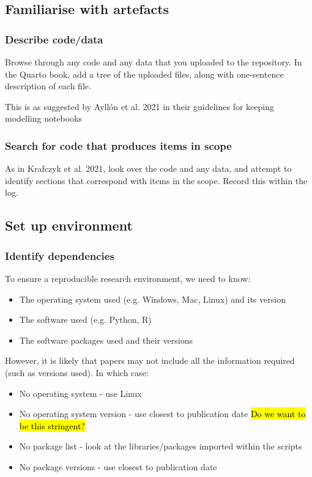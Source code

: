 \subsection{Familiarise with artefacts}

\subsubsection{Describe code/data}
\timeyes

Browse through any code and any data that you uploaded to the repository. In the Quarto book, add a tree of the uploaded files, along with one-sentence description of each file.

This is as suggested by Ayllón et al. 2021\autocite{ayllon_keeping_2021} in their guidelines for keeping modelling notebooks

\subsubsection{Search for code that produces items in scope}
\timeyes

As in Krafczyk et al. 2021,\cite{krafczyk_learning_2021} look over the code and any data, and attempt to identify sections that correspond with items in the scope. Record this within the log.

\subsection{Set up environment}

\subsubsection{Identify dependencies}
\timeyes

To ensure a reproducible research environment, we need to know:
\begin{itemize}
    \item The operating system used (e.g. Windows, Mac, Linux) and its version 
    \item The software used (e.g. Python, R)
    \item The software packages used and their versions\autocite{the_turing_way_community_turing_2022}
\end{itemize}

However, it is likely that papers may not include all the information required (such as versions used). In which case:
\begin{itemize}
    \item No operating system - use Linux
    \item No operating system version - use closest to publication date \hl{Do we want to be this stringent?}
    \item No package list - look at the libraries/packages imported within the scripts
    \item No package versions - use closest to publication date
\end{itemize}

